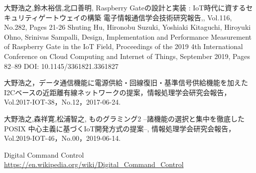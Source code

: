 \begin{thebibliography}{2}


大野浩之,鈴木裕信,北口善明,
Raspberry Gateの設計と実装 : IoT時代に資するセキュリティゲートウェイの構築
電子情報通信学会技術研究報告,,
Vol.116, No.282, Pages 21-26
Shuting Hu, Hironobu Suzuki, Yoshiaki Kitaguchi, Hiroyuki Ohno, Srinivas Sampalli,
Design, Implementation and Performance Measurement of Raspberry Gate in the IoT Field, 
Proceedings of the 2019 4th International Conference on Cloud Computing and Internet of Things, September 2019, Pages 82–89
DOI: 10.1145/3361821.3361827	

  大野浩之，データ通信機能に電源供給・回線復旧・基準信号供給機能を加えたI2Cベースの近距離有線ネットワークの提案，情報処理学会研究会報告，Vol.2017-IOT-38，No.12，2017-06-24.

  大野浩之,森祥寛,松浦智之,  ものグラミング2 --諸機能の選択と集中を徹底したPOSIX 中心主義に基づくIoT開発方式の提案--, 情報処理学会研究会報告，Vol.2019-IOT-46，No.00，2019-06-14.

Digital Command Control
\url{https://en.wikipedia.org/wiki/Digital_Command_Control}


\end{thebibliography}
